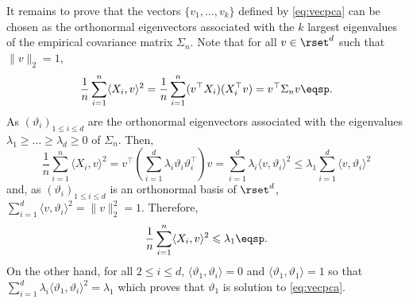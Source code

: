 It remains to prove that the vectors $\{v_1, \ldots , v_k\}$ defined by \eqref{eq:vecpca} can be chosen as the orthonormal eigenvectors associated with the $k$ largest eigenvalues of the empirical covariance matrix $\Sigma_n$. Note that for all $v\in \rset^d$ such that $\|v\|_2=1$,
$$
\frac{1}{n}\sum_{i=1}^n\langle X_i,v\rangle^2 = \frac{1}{n}\sum_{i=1}^n (v^\top X_i)(X^\top_iv) = v^\top\Sigma_n v\eqsp.
$$
As $(\vartheta_i)_{1\leqslant i \leqslant d}$ are the orthonormal eigenvectors associated with the eigenvalues $\lambda_1\geqslant \ldots \geqslant\lambda_d\geqslant 0$ of $\Sigma_n$. Then,
$$
\frac{1}{n}\sum_{i=1}^n\langle X_i,v\rangle^2 = v^\top\left(\sum_{i=1}^d \lambda_i \vartheta_i\vartheta^\top_i\right)v = \sum_{i=1}^d \lambda_i \langle v,\vartheta_i\rangle^2\leqslant \lambda_1  \sum_{i=1}^d \langle v,\vartheta_i\rangle^2
$$
and, as $(\vartheta_i)_{1\leqslant i \leqslant d}$ is an orthonormal basis of $\rset^d$,  $\sum_{i=1}^d \langle v,\vartheta_i\rangle^2 = \|v\|_2^2 = 1$. Therefore,
\[
\frac{1}{n}\sum_{i=1}^n\langle X_i,v\rangle^2 \leqslant \lambda_1\eqsp.
\] 
On the other hand, for all $2\leqslant i \leqslant d$, $\langle \vartheta_1,\vartheta_i\rangle =0$ and $\langle \vartheta_1,\vartheta_1\rangle=1$ so that $\sum_{i=1}^d \lambda_i \langle \vartheta_1,\vartheta_i\rangle^2 = \lambda_1$ which proves that $\vartheta_1$ is solution to \eqref{eq:vecpca}.

